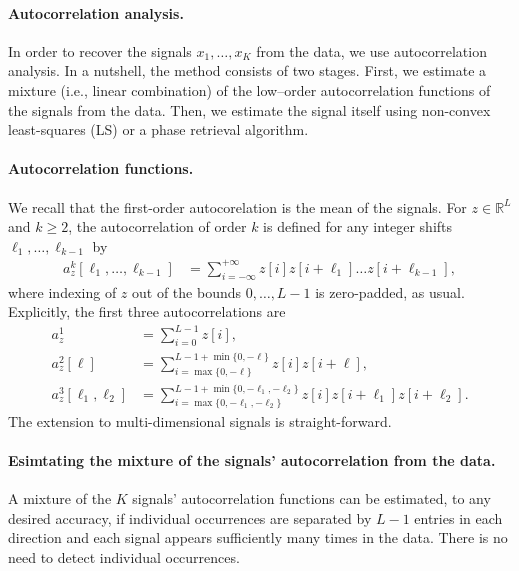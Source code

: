 \documentclass[english,11pt]{article}
\theoremstyle{plain}
\theoremstyle{definition}
\theoremstyle{remark}
\theoremstyle{plain}
\newcommand{\RL}{\mathbb{R}^L}
\begin{document}
\paragraph{Autocorrelation analysis.}
In order to recover the signals $x_1,\dots,x_K$ from the data, we use autocorrelation analysis.
In a nutshell, the method consists of two stages. First, we estimate a mixture (i.e., linear combination) of the low--order autocorrelation functions of the signals from the data. Then, we estimate the signal itself using non-convex least-squares (LS) or a phase retrieval algorithm. 

\paragraph{Autocorrelation functions.}
We recall that the first-order autocorelation is the mean of the signals. For  
$z\in\RL$ and $k\geq 2$, the autocorrelation of order $k$ is defined for any integer shifts $\ell_1, \ldots, \ell_{k-1}$ by
\begin{align}
a_z^k[\ell_1,\ldots,\ell_{k-1}]  & = \sum_{i=-\infty}^{+\infty} z[i]z[i+\ell_1]\ldots z[i+\ell_{k-1}],
\label{eq:ac_general}
\end{align}
where indexing of $z$ out of the bounds $0, \ldots, L-1$ is zero-padded, as usual.
Explicitly, the first three autocorrelations are
\begin{align} 
a_z^1 & = \sum_{i=0}^{L-1} z[i], \nonumber\\
a_z^2[\ell] & = \sum_{i = \max\{0, -\ell\}}^{L-1 + \min\{0, -\ell\}} z[i]z[i+\ell], \nonumber\\
a_z^3[\ell_1,\ell_2] & = \sum_{i = \max\{0, -\ell_1, -\ell_2\}}^{L-1 + \min\{0, -\ell_1, -\ell_2\}} z[i]z[i+\ell_1]z[i+\ell_2]. \label{eq:ac_special}
\end{align}
The extension to multi-dimensional signals is straight-forward.


\paragraph{Esimtating the mixture of the signals' autocorrelation from the data.}
A mixture of the $K$ signals' autocorrelation functions can be estimated, to any desired accuracy, if individual occurrences are separated by  $L-1$ entries in each direction and each signal appears sufficiently many times in the data. There is no need to detect individual occurrences.
\end{document}
